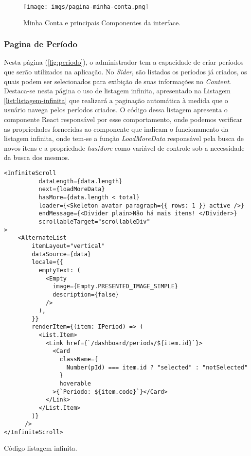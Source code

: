 \begin{figure}[h]
    \centering
    \texttt{[image: imgs/pagina-minha-conta.png]}
    \caption{Minha Conta e principais Componentes da interface.}
    \label{fig:dashboard:mark}
\end{figure}



\subsubsection{Pagina de Período}\label{subsec:pag-periodo}

Nesta página (\ref{fig:periodo}), o administrador tem a capacidade de criar períodos que serão utilizados na aplicação. No \textit{Sider}, são listados os períodos já criados, os quais podem ser selecionados para exibição de suas informações no \textit{Content}. Destaca-se nesta página o uso de listagem infinita, apresentado na Listagem \ref{list:listagem-infinita} que realizará a paginação automática à medida que o usuário navega pelos períodos criados. O código dessa listagem apresenta o componente React responsável por esse comportamento, onde podemos verificar as propriedades fornecidas ao componente que indicam o funcionamento da listagem infinita, onde tem-se a função \textit{LoadMoreData} responsável pela busca de novos itens e a propriedade \textit{hasMore} como variável de controle sob a necessidade da busca dos mesmos.


\begin{listing}[h]
    \begin{verbatim}
<InfiniteScroll
          dataLength={data.length}
          next={loadMoreData}
          hasMore={data.length < total}
          loader={<Skeleton avatar paragraph={{ rows: 1 }} active />}
          endMessage={<Divider plain>Não há mais itens! </Divider>}
          scrollableTarget="scrollableDiv"
>
    <AlternateList
        itemLayout="vertical"
        dataSource={data}
        locale={{
          emptyText: (
            <Empty
              image={Empty.PRESENTED_IMAGE_SIMPLE}
              description={false}
            />
          ),
        }}
        renderItem={(item: IPeriod) => (
          <List.Item>
            <Link href={`/dashboard/periods/${item.id}`}>
              <Card
                className={
                  Number(pId) === item.id ? "selected" : "notSelected"
                }
                hoverable
              >{`Periodo: ${item.code}`}</Card>
            </Link>
          </List.Item>
        )}
      />
</InfiniteScroll>
    \end{verbatim}
    \caption{Código listagem infinita.}
    \label{list:listagem-infinita}
\end{listing}



